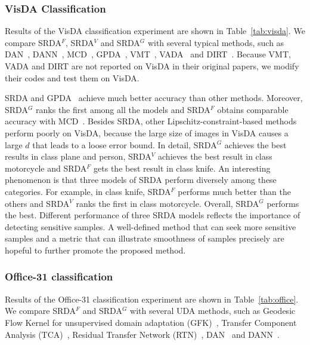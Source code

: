 \documentclass[journal,twocolumn]{IEEEtran}
\theoremstyle{definition}
\begin{document}
\subsubsection{VisDA Classification}

Results of the VisDA classification experiment are shown in Table~\ref{tab:visda}. We compare SRDA$^F$, SRDA$^V$ and SRDA$^G$ with several typical methods, such as DAN~\cite{pmlr-v37-long15}, DANN~\cite{ganin2016domain}, MCD~\cite{saito2018maximum}, GPDA~\cite{8953535}, VMT~\cite{mao2019virtual}, VADA~\cite{shu2018a} and DIRT~\cite{shu2018a}. Because VMT, VADA and DIRT are not reported on VisDA in their original papers, we modify their codes and test them on VisDA.

SRDA and GPDA~\cite{8953535} achieve much better accuracy than other methods. Moreover, SRDA$^G$ ranks the first among all the models and SRDA$^F$ obtains comparable accuracy with MCD~\cite{saito2018maximum}. Besides SRDA, other Lipschitz-constraint-based methods perform poorly on VisDA, because the large size of images in VisDA causes a large $d$ that leads to a loose error bound. In detail, SRDA$^G$ achieves the best results in class plane and person, SRDA$^V$ achieves the best result in class motorcycle and SRDA$^F$ gets the best result in class knife. An interesting phenomenon is that three models of SRDA perform diversely among these categories. For example, in class knife, SRDA$^F$ performs much better than the others and SRDA$^V$ ranks the first in class motorcycle. Overall, SRDA$^G$ performs the best. Different performance of three SRDA models reflects the importance of detecting sensitive samples. A well-defined method that can seek more sensitive samples and a metric that can illustrate smoothness of samples precisely are hopeful to further promote the proposed method.

\subsubsection{Office-31 classification}
Results of the Office-31 classification experiment are shown in Table~\ref{tab:office}. We compare SRDA$^F$ and SRDA$^G$ with several UDA methods, such as Geodesic Flow Kernel for unsupervised domain adaptation (GFK)~\cite{gong2012geodesic}, Transfer Component Analysis (TCA)~\cite{pan2010domain}, Residual Transfer Network (RTN)~\cite{long2016unsupervised}, DAN~\cite{pmlr-v37-long15} and DANN~\cite{ganin2016domain}. 
\end{document}
